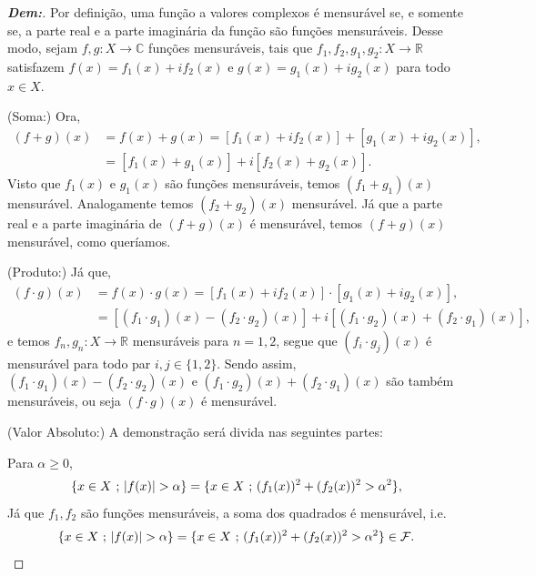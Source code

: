 \begin{proof}[\textbf{Dem:}] Por definição, uma função a valores complexos é mensurável se, 
  e somente se, a parte real e a parte imaginária da função são funções mensuráveis. 
  Desse modo, sejam $f, g: X \rightarrow \mathbb C$ funções mensuráveis, tais que 
  $f_1, f_2, g_1, g_2: X \rightarrow \mathbb R$ satisfazem $f(x) = f_1(x)+if_2(x)$
  e $g(x)=g_1(x)+ig_2(x)$ para todo $x \in X$.
  \vspace{5mm}

\noindent
(Soma:) Ora,
\begin{align*}
  (f+g)(x) &= f(x) + g(x) = [f_1(x)+if_2(x)] + [g_1(x)+ig_2(x)],\\
  &= [f_1(x) + g_1(x)] + i[f_2(x) + g_2(x)].
\end{align*}
Visto que $f_1(x)$ e $g_1(x)$ são funções mensuráveis, temos $(f_1 + g_1)(x)$ mensurável. Analogamente temos 
  $(f_2+g_2)(x)$ mensurável. Já que a parte real e a parte imaginária de $(f+g)(x)$ é mensurável, temos 
  $(f+g)(x)$ mensurável, como queríamos.
  \vspace{5mm}

\noindent
  (Produto:) Já que, 
\begin{align*}
  (f\cdot g)(x) &= f(x)\cdot g(x) = [f_1(x)+if_2(x)]\cdot[g_1(x) + ig_2(x)], \\
  &= [(f_1\cdot g_1)(x) - (f_2\cdot g_2)(x)] + i[(f_1\cdot g_2)(x) + (f_2 \cdot g_1)(x)],
\end{align*}
  e temos $f_n,g_n: X \rightarrow \mathbb R$ mensuráveis para $n=1, 2$, segue que $(f_i\cdot g_j)(x)$ é 
  mensurável para todo par $i, j \in \{1, 2\}$. Sendo assim, $(f_1\cdot g_1)(x) - (f_2\cdot g_2)(x)$ e 
  $(f_1\cdot g_2)(x) + (f_2 \cdot g_1)(x)$ são também mensuráveis, ou seja $(f\cdot g)(x)$ é mensurável. 
  
  \vspace{5mm}
  \noindent
  (Valor Absoluto:) A demonstração será divida nas seguintes partes:

  Para $\alpha \ge 0$, 
  \begin{align*}
    \{x \in X\st |f(x)|> \alpha\} = \{ x \in X\st (f_1(x))^2 + (f_2(x))^2 > \alpha^2\},
  \end{align*}
  Já que $f_1, f_2$ são funções mensuráveis, a soma dos quadrados é mensurável, i.e.
  \begin{align*}
   \{x \in X\st |f(x)|> \alpha\} = \{ x \in X\st (f_1(x))^2 + (f_2(x))^2 > \alpha^2\}\in \mathcal F.
  \end{align*}


\end{proof}

